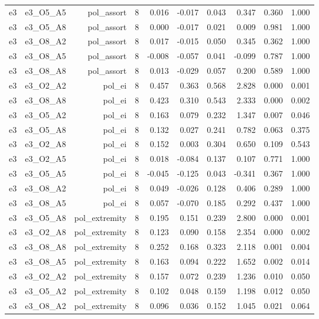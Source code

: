 \documentclass[11pt]{article}
\begin{document}
\begin{landscape}
\begin{longtable}{@{}lrrrrrrrrr@{}}
e3 & e3\_O5\_A5 & pol\_assort & 8 & 0.016 & -0.017 & 0.043 & 0.347 & 0.360 & 1.000 \\
e3 & e3\_O5\_A8 & pol\_assort & 8 & 0.000 & -0.017 & 0.021 & 0.009 & 0.981 & 1.000 \\
e3 & e3\_O8\_A2 & pol\_assort & 8 & 0.017 & -0.015 & 0.050 & 0.345 & 0.362 & 1.000 \\
e3 & e3\_O8\_A5 & pol\_assort & 8 & -0.008 & -0.057 & 0.041 & -0.099 & 0.787 & 1.000 \\
e3 & e3\_O8\_A8 & pol\_assort & 8 & 0.013 & -0.029 & 0.057 & 0.200 & 0.589 & 1.000 \\
e3 & e3\_O2\_A2 & pol\_ei & 8 & 0.457 & 0.363 & 0.568 & 2.828 & 0.000 & 0.001 \\
e3 & e3\_O8\_A8 & pol\_ei & 8 & 0.423 & 0.310 & 0.543 & 2.333 & 0.000 & 0.002 \\
e3 & e3\_O5\_A2 & pol\_ei & 8 & 0.163 & 0.079 & 0.232 & 1.347 & 0.007 & 0.046 \\
e3 & e3\_O5\_A8 & pol\_ei & 8 & 0.132 & 0.027 & 0.241 & 0.782 & 0.063 & 0.375 \\
e3 & e3\_O2\_A8 & pol\_ei & 8 & 0.152 & 0.003 & 0.304 & 0.650 & 0.109 & 0.543 \\
e3 & e3\_O2\_A5 & pol\_ei & 8 & 0.018 & -0.084 & 0.137 & 0.107 & 0.771 & 1.000 \\
e3 & e3\_O5\_A5 & pol\_ei & 8 & -0.045 & -0.125 & 0.043 & -0.341 & 0.367 & 1.000 \\
e3 & e3\_O8\_A2 & pol\_ei & 8 & 0.049 & -0.026 & 0.128 & 0.406 & 0.289 & 1.000 \\
e3 & e3\_O8\_A5 & pol\_ei & 8 & 0.057 & -0.070 & 0.185 & 0.292 & 0.437 & 1.000 \\
e3 & e3\_O5\_A8 & pol\_extremity & 8 & 0.195 & 0.151 & 0.239 & 2.800 & 0.000 & 0.001 \\
e3 & e3\_O2\_A8 & pol\_extremity & 8 & 0.123 & 0.090 & 0.158 & 2.354 & 0.000 & 0.002 \\
e3 & e3\_O8\_A8 & pol\_extremity & 8 & 0.252 & 0.168 & 0.323 & 2.118 & 0.001 & 0.004 \\
e3 & e3\_O8\_A5 & pol\_extremity & 8 & 0.163 & 0.094 & 0.222 & 1.652 & 0.002 & 0.014 \\
e3 & e3\_O2\_A2 & pol\_extremity & 8 & 0.157 & 0.072 & 0.239 & 1.236 & 0.010 & 0.050 \\
e3 & e3\_O5\_A2 & pol\_extremity & 8 & 0.102 & 0.048 & 0.159 & 1.198 & 0.012 & 0.050 \\
e3 & e3\_O8\_A2 & pol\_extremity & 8 & 0.096 & 0.036 & 0.152 & 1.045 & 0.021 & 0.064 \\

\end{longtable}
\end{landscape}
\end{document}
